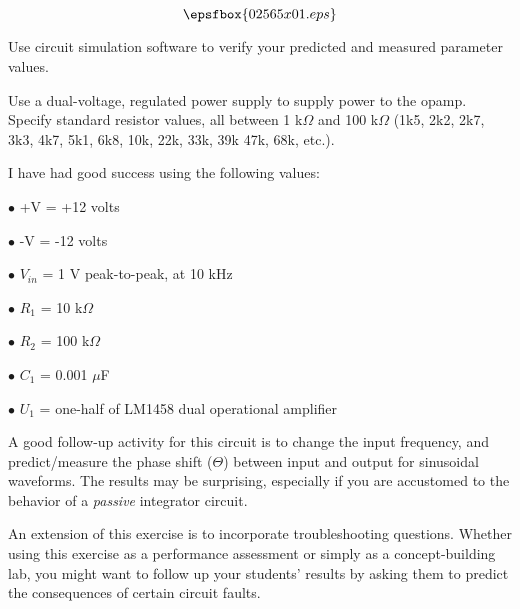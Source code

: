 

$$\epsfbox{02565x01.eps}$$

\vfil \eject






Use circuit simulation software to verify your predicted and measured parameter values.







Use a dual-voltage, regulated power supply to supply power to the opamp.  Specify standard resistor values, all between 1 k$\Omega$ and 100 k$\Omega$ (1k5, 2k2, 2k7, 3k3, 4k7, 5k1, 6k8, 10k, 22k, 33k, 39k 47k, 68k, etc.).

I have had good success using the following values:

\medskip
\item{$\bullet$} +V = +12 volts
\item{$\bullet$} -V = -12 volts
\item{$\bullet$} $V_{in}$ = 1 V peak-to-peak, at 10 kHz
\item{$\bullet$} $R_1$ = 10 k$\Omega$
\item{$\bullet$} $R_2$ = 100 k$\Omega$
\item{$\bullet$} $C_1$ = 0.001 $\mu$F
\item{$\bullet$} $U_1$ = one-half of LM1458 dual operational amplifier
\medskip

A good follow-up activity for this circuit is to change the input frequency, and predict/measure the phase shift ($\Theta$) between input and output for sinusoidal waveforms.  The results may be surprising, especially if you are accustomed to the behavior of a {\it passive} integrator circuit.

An extension of this exercise is to incorporate troubleshooting questions.  Whether using this exercise as a performance assessment or simply as a concept-building lab, you might want to follow up your students' results by asking them to predict the consequences of certain circuit faults.




